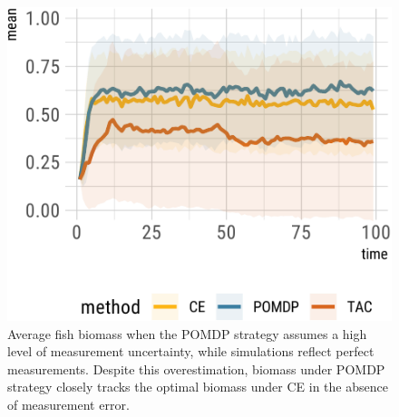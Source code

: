 \documentclass[3p]{elsarticle} %
\makeatletter
\def\maxwidth{\ifdim\Gin@nat@width>\linewidth\linewidth
\else\Gin@nat@width\fi}
\let\Oldincludegraphics\includegraphics
\renewcommand{\includegraphics}[1]{\Oldincludegraphics[width=\maxwidth]{#1}}
\makeatother
\begin{document}
\begin{figure}
\centering
\includegraphics{manuscript_files/figure-latex/overest-1.pdf}
\caption{Average fish biomass when the POMDP strategy assumes a high
level of measurement uncertainty, while simulations reflect perfect
measurements. Despite this overestimation, biomass under POMDP strategy
closely tracks the optimal biomass under CE in the absence of
measurement error. \label{overest}}
\end{figure}
\end{document}
